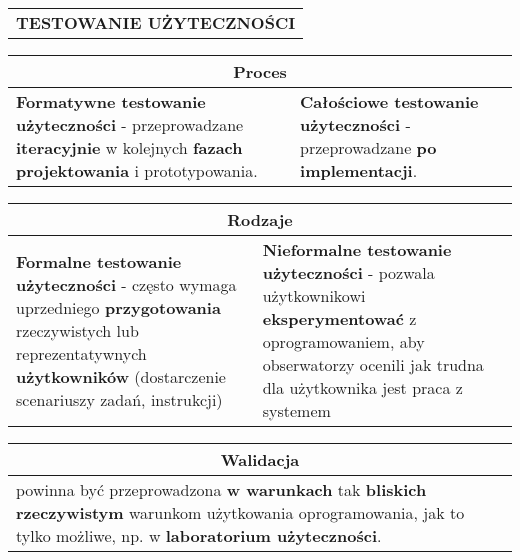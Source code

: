 \documentclass[../main.tex]{subfiles}
\begin{document}
    \begin{table}[H]
        \begin{center}
            \begin{tabular}{| p{8cm} | p{8cm} |}
                \multicolumn{2}{c}{\textbf{TESTOWANIE UŻYTECZNOŚCI}}\\
            \end{tabular}
        \end{center}
    \end{table}
    \begin{table}[H]
        \begin{center}
            \begin{tabular}{| p{8cm} | p{8cm} |}
                \hline
                \multicolumn{2}{|c|}{\textbf{Proces}}\\
                \hline
                \textbf{Formatywne testowanie użyteczności} - przeprowadzane \textbf{iteracyjnie} w
                kolejnych \textbf{fazach projektowania} i prototypowania.
                &
                \textbf{Całościowe testowanie użyteczności} - przeprowadzane \textbf{po implementacji}.
                \\
                \hline
            \end{tabular}
        \end{center}
    \end{table}
    \begin{table}[H]
        \begin{center}
            \begin{tabular}{| p{8cm} | p{8cm} |}
                \hline
                \multicolumn{2}{|c|}{\textbf{Rodzaje}}\\
                \hline
                \textbf{Formalne testowanie użyteczności} - często wymaga uprzedniego \textbf{przygotowania} rzeczywistych
                lub reprezentatywnych \textbf{użytkowników} (dostarczenie scenariuszy zadań, instrukcji)
                &
                \textbf{Nieformalne testowanie użyteczności} - pozwala użytkownikowi \textbf{eksperymentować} z
                oprogramowaniem, aby obserwatorzy ocenili jak trudna dla użytkownika jest praca z systemem\\
                \hline
            \end{tabular}
        \end{center}
    \end{table}
    \begin{table}[H]
        \begin{center}
            \begin{tabular}{| p{8cm} | p{8cm} |}
                \hline
                \multicolumn{2}{|c|}{\textbf{Walidacja}}\\
                \hline
                \multicolumn{2}{|p{16,5cm}|}{powinna być przeprowadzona \textbf{w warunkach} tak \textbf{bliskich rzeczywistym} warunkom użytkowania
                oprogramowania, jak to tylko możliwe, np. w \textbf{laboratorium użyteczności}.}\\
                \hline
            \end{tabular}
        \end{center}
    \end{table}
\end{document}
